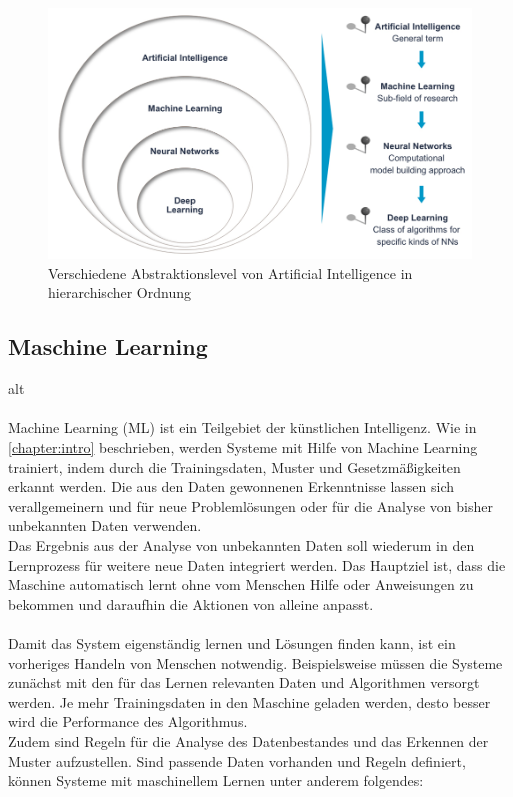 \documentclass[12pt,oneside,a4paper,parskip]{scrbook}
\begin{document}
\begin{figure}[ht]
	\begin{center}
		\includegraphics[width=12cm]{Bilder/Abstraktionslevel_von_AI.jpg}
		\caption{Verschiedene Abstraktionslevel von Artificial Intelligence in hierarchischer Ordnung}
		\label{fig:overview}
	\end{center}
\end{figure}

\subsection{Maschine Learning}
alt
\\\\
Machine Learning (ML) ist ein Teilgebiet der künstlichen Intelligenz. Wie in \ref{chapter:intro} beschrieben, werden Systeme mit Hilfe von Machine Learning trainiert, indem durch die Trainingsdaten, Muster und Gesetzmäßigkeiten erkannt werden. Die aus den Daten gewonnenen Erkenntnisse lassen sich verallgemeinern und für neue Problemlösungen oder für die Analyse von bisher unbekannten Daten verwenden.\\
Das Ergebnis aus der Analyse von unbekannten Daten soll wiederum in den Lernprozess für weitere neue Daten integriert werden. Das Hauptziel ist, dass die Maschine automatisch lernt ohne vom Menschen Hilfe oder Anweisungen zu bekommen und daraufhin die Aktionen von alleine anpasst\cite{EliminateHumanBias}.
\\\\
Damit das System eigenständig lernen und Lösungen finden kann, ist ein vorheriges Handeln von Menschen notwendig. Beispielsweise müssen die Systeme zunächst mit den für das Lernen relevanten Daten und Algorithmen versorgt werden.
Je mehr Trainingsdaten in den Maschine geladen werden, desto besser wird die Performance des Algorithmus.\\
Zudem sind Regeln für die Analyse des Datenbestandes und das Erkennen der Muster aufzustellen. Sind passende Daten vorhanden und Regeln definiert, können Systeme mit maschinellem Lernen unter anderem folgendes:
\end{document}
